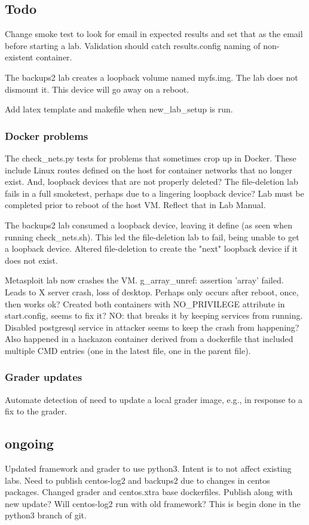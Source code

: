 \documentclass[12pt]{article}
\begin{document}
\subsection{Todo}
Change smoke test to look for email in expected results and set that as the email before starting a lab.
Validation should catch results.config naming of non-existent container.

The backups2 lab creates a loopback volume named myfs.img.  The lab does not dismount it.
This device will go away on a reboot.

Add latex template and makefile when new\_lab\_setup is run.

\subsubsection{Docker problems}
The check\_nets.py tests for problems that sometimes crop up in Docker.  These include Linux routes defined
on the host for container networks that no longer exist.  And, loopback devices that are not properly deleted?
The file-deletion lab fails in a full smoketest, perhaps due to a lingering loopback device?
Lab must be completed prior to reboot of the host VM. Reflect that in Lab Manual.

The backups2 lab consumed a loopback device, leaving it define (as seen when running check\_nets.sh).  This
led the file-deletion lab to fail, being unable to get a loopback device.  Altered file-deletion to create the
"next" loopback device if it does not exist.

Metasploit lab now crashes the VM.  g\_array\_unref: assertion 'array' failed.   Leads to X server crash, loss of
desktop.  Perhaps only occurs after reboot, once, then works ok?  Created both containers with NO\_PRIVILEGE attribute
in start.config, seems to fix it?  NO: that breaks it by keeping services from running.  Disabled postgresql service
in attacker seems to keep the crash from happening?  Also happened in a hackazon container derived from a dockerfile that
included multiple CMD entries (one in the latest file, one in the parent file).

\subsubsection{Grader updates}
Automate detection of need to update a local grader image, e.g., in response to a fix to the grader.

\subsection{ongoing}
Updated framework and grader to use python3.  Intent is to not affect existing labs.  Need to publish centos-log2 and
backups2 due to changes in centos packages.  Changed grader and centos.xtra base dockerfiles.
Publish along with new update?   Will centos-log2 run with old framework?
This is begin done in the python3 branch of git.
\end{document}
